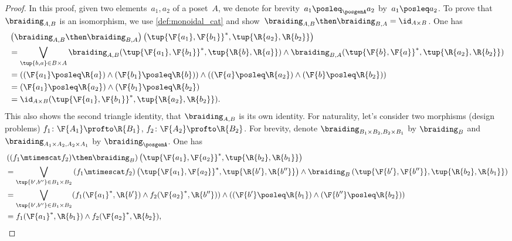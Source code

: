 \begin{proof}
  In this proof, given two elements~$a_1,a_2$ of a poset~$A$, we denote for brevity~$a_1 \posleq_\posgenA a_2$ by~$a_1 \posleq a_2$.
  To prove that~$\braiding_{A,B}$ is an isomorphism, we use \cref{def:monoidal_cat} and show~$\braiding_{A,B}\then \braiding_{B,A}=\id_{A\times B}$. One has
  \begin{equation}
    \begin{aligned}
      &\left( \braiding_{A,B}\then \braiding_{B,A}\right) \left( \tup{\F{a_1},\F{b_1}}^*,\tup{\R{a_2},\R{b_2}}\right)\\
      &=\bigvee_{\tup{b,a}\in B\times A}\braiding_{A,B}(\tup{\F{a_1},\F{b_1}}^*,\tup{\R{b},\R{a}})\wedge \braiding_{B,A}(\tup{\F{b},\F{a}}^*,\tup{\R{a_2},\R{b_2}})\\
      &=\left( (\F{a_1}\posleq \R{a}) \wedge (\F{b_1}\posleq \R{b})\right)\wedge \left((\F{a}\posleq \R{a_2}) \wedge (\F{b}\posleq \R{b_2})\right)\\
      &=(\F{a_1}\posleq \R{a_2})\wedge (\F{b_1}\posleq \R{b_2})\\
      &=\id_{A\times B}(\tup{\F{a_1},\F{b_1}}^*,\tup{\R{a_2},\R{b_2}}).
    \end{aligned}
  \end{equation}
  This also shows the second triangle identity, \ie  that $\braiding_{A,B}$ is its own identity.
  For naturality, let's consider two morphisms (design problems) $f_1\colon \F{A_1}\profto \R{B_1}$, $f_2\colon \F{A_2}\profto \R{B_2}$. For brevity, denote $\braiding_{B_1\times B_2,B_2\times B_1}$ by $\braiding_B$ and $\braiding_{A_1\times A_2,A_2\times A_1}$ by $\braiding_\posgenA$. One has
  \begin{equation}
    \begin{aligned}
      &\left((f_1\mtimescat f_2)\then \braiding_B \right)\left( \tup{\F{a_1},\F{a_2}}^*,\tup{\R{b_2},\R{b_1}}\right)\\
      &=\bigvee_{\tup{b',b''}\in B_1\times B_2} \left(f_1\mtimescat f_2\right) \left( \tup{\F{a_1},\F{a_2}}^*,\tup{\R{b'},\R{b''}}\right)\wedge \braiding_B\left(\tup{\F{b'},\F{b''}},\tup{\R{b_2},\R{b_1}} \right)\\
      &=\bigvee_{\tup{b',b''}\in B_1\times B_2}(f_1(\F{a_1}^*,\R{b'})\wedge f_2(\F{a_2}^*,\R{b''}))\wedge (\left(\F{b'}\posleq \R{b_1}\right) \wedge \left(\F{b''}\posleq \R{b_2}\right))\\
      &= f_1(\F{a_1}^*,\R{b_1}) \wedge f_2(\F{a_2}^*,\R{b_2}),
    \end{aligned}
  \end{equation}

\end{proof}
